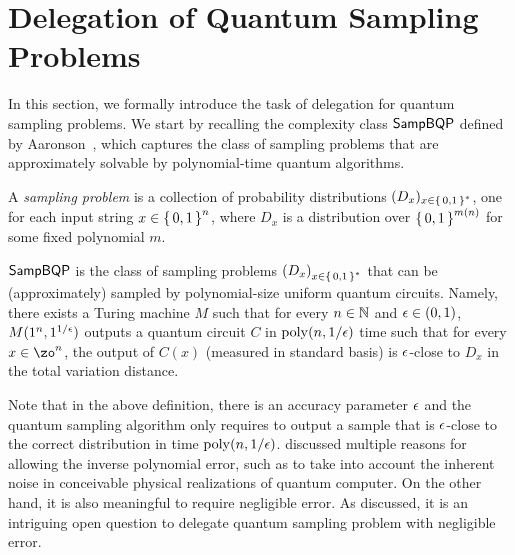 \section{Delegation of Quantum Sampling Problems} \label{sec:samp_definition}

In this section, we formally introduce the task of delegation for quantum sampling problems. We start by recalling the complexity class $\SampBQP$ defined by Aaronson~\cite{aaronson_2013, Boson}, which captures the class of sampling problems that
are approximately solvable by polynomial-time quantum algorithms.


\begin{definition} 
    \label{dfn:sampling-problem}
    A \emph{sampling problem} is a collection of probability distributions $(D_x)_{x\in\set{0, 1}^*}$, one for each input string $x\in\set{0,1}^n$, where $D_x$ is a distribution over $\set{0,1}^{m(n)}$ for some fixed polynomial $m$.
\end{definition}

\begin{definition} [$\SampBQP$]
    $\SampBQP$ is the class of sampling problems $\left(D_x\right)_{x\in\set{0, 1}^*}$ that can be (approximately) sampled by polynomial-size uniform quantum circuits. Namely, there exists a Turing machine $M$ such that for every $n \in \mathbb{N}$ and $\epsilon \in (0,1)$, $M(1^n, 1^{1/\epsilon})$ outputs a quantum circuit $C$ in $\operatorname*{\operatorname{poly}}(n, 1/\epsilon)$ time such that for every $x \in \zo^n$, the output of $C(x)$ (measured in standard basis) is $\epsilon$-close to $D_x$ in the total variation distance. 
\end{definition}

Note that in the above definition, there is an accuracy parameter $\epsilon$ and the quantum sampling algorithm only requires to output a sample that is $\epsilon$-close to the correct distribution in time $\operatorname*{\operatorname{poly}}(n,1/\epsilon)$.
\cite{aaronson_2013, Boson} discussed multiple reasons for allowing the inverse polynomial error, such as to take into account the inherent noise in conceivable physical realizations of quantum computer.
On the other hand, it is also meaningful to require negligible error. As discussed, it is an intriguing open question to delegate quantum sampling problem with negligible error.  

